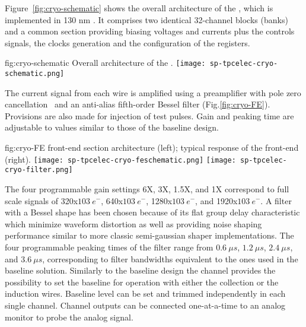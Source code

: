 Figure~\ref{fig:cryo-schematic} shows the overall architecture of the  , which is implemented in 130 nm . It comprises two identical 32-channel blocks (banks) and a common section providing biasing voltages and currents plus the controls signals, the clocks generation and the configuration of the registers.

\begin{dunefigure}
{fig:cryo-schematic}
{Overall architecture of the  .}
\texttt{[image: sp-tpcelec-cryo-schematic.png]}
\end{dunefigure}

The current signal from each wire is amplified using a preamplifier with pole zero cancellation~\cite{DeGeronimo:2011zz} and an anti-alias fifth-order Bessel filter (Fig.\ref{fig:cryo-FE}). Provisions are also made for injection of test pulses. Gain and peaking time are adjustable to values similar to those of the baseline design. 

\begin{dunefigure}
{fig:cryo-FE}
{ front-end section architecture (left); typical response of the  front-end (right).}
\texttt{[image: sp-tpcelec-cryo-feschematic.png]}
\texttt{[image: sp-tpcelec-cryo-filter.png]}
\end{dunefigure}

The four programmable gain settings 6X, 3X, 1.5X, and 1X correspond to full scale signals of 320x$\SI{103}{e^{-}}$, 640x$\SI{103}{e^{-}}$, 1280x$\SI{103}{e^{-}}$, and 1920x$\SI{103}{e^{-}}$. A filter with a Bessel shape has been chosen because of its flat group delay characteristic which minimize waveform distortion as well as providing noise shaping performance similar to more classic semi-gaussian shaper implementations. The four programmable peaking times of the filter range from $\SI{0.6}{{\mu}s}$, $\SI{1.2}{{\mu}s}$, $\SI{2.4}{{\mu}s}$, and $\SI{3.6}{{\mu}s}$, corresponding to filter bandwidths equivalent to the ones used in the baseline solution. Similarly to the baseline design the channel provides the possibility to set the baseline for operation with either the collection or the induction wires. Baseline level can be set and trimmed independently in each single channel. Channel outputs can be connected one-at-a-time to an analog monitor to probe the analog signal.

